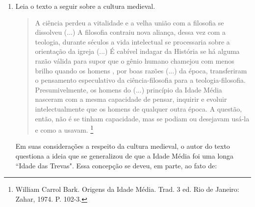 \documentclass[10pt,a4paper]{article}
\begin{document}
\begin{multicols}{2}
\begin{enumerate}
		\begin{enumerate}
	       \item Os ``infi\'eis", genericamente, eram os mul\c{c}umanos. As expedi\c{c}\~oes eram denominadas Cruzadas, e que possu\'iam como inspira\c{c}\~ao econ\^omica, por exemplo, a acumula\c{c}\~ao de moedas de ouro e prata do oriente.
		\item Os ``infi\'eis", genericamente, eram os africanos. As expedi\c{c}\~oes eram denominadas Cruzadas, e que possu\'iam como inspira\c{c}\~ao econ\^omica a conquista de escravos de guerra.
		\item Os ``infi\'eis", genericamente, eram os mul\c{c}umanos. Cruzadas \'e a denomina\c{c}\~ao utilizada para se referir a esta s\'erie de expedi\c{c}\~oes realizadas pelos crist\~aos com o prop\'osito econ\^omico de, por exemplo,  reabrir e dominar rotas comerciais.
		\item Genericamente, os ``infi\'eis" eram os mu\c{c}ulmanos e as expedi\c{c}\~oes eram chamadas de peregrina\c{c}\~oes. Possu\'iam motiva\c{c}\~oes econ\^omicas diversas, muitas delas estavam intimamente ligadas \`a acumula\c{c}\~ao de itens religiosos que possu\'iam grande capital simb\'olico.
		\item Genericamente, os ``infi\'eis" eram os mu\c{c}ulmanos e as expedi\c{c}\~oes eram chamadas de cruzadas. Possu\'iam motiva\c{c}\~oes econ\^omicas diversas, dentre elas a realiza\c{c}\~ao de trocas comerciais em todo o oceano atlântico
		\end{enumerate}

	\item Leia o texto a seguir sobre a cultura medieval.
		\begin{quote}
		A ci\^encia perdeu a vitalidade e a velha uni\~ao com a filosofia se dissolveu (...) A filosofia contraiu nova alian\c{c}a, dessa vez com a teologia, durante s\'eculos a vida intelectual se processaria sobre a orienta\c{c}\~ao da igreja (...) \'E cab\'ivel indagar da Hist\'oria se h\'a alguma raz\~ao v\'alida para supor que o g\^enio humano chamejou com menos brilho quando os homens , por boas raz\~oes (...) da \'epoca, transferiram o pensamento especulativo da ci\^encia-filosofia para a teologia-filosofia. Presumivelmente, os homens do (...) princ\'ipio da Idade M\'edia nasceram com a mesma capacidade de pensar, inquirir e evoluir intelectualmente que os homens de qualquer outra \'epoca. A quest\~ao, ent\~ao, n\~ao \'e se tinham capacidade, mas se podiam ou desejavam us\'a-la e como a usavam. \footnote{William Carrol Bark. Origens da Idade M\'edia.
 Trad. 3 ed. Rio de Janeiro: Zahar, 1974. P. 102-3.}
		\end{quote}
	Em suas considera\c{c}\~oes a respeito da cultura medieval, o autor do texto questiona a ideia que se generalizou de que a Idade M\'edia foi uma longa ``Idade das Trevas". Essa concep\c{c}\~ao se deveu, em parte, ao fato de:


\end{enumerate}
\end{multicols}
\end{document}
